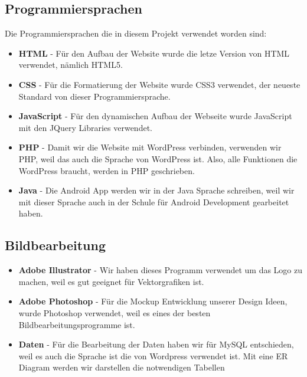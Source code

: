 \subsection{Programmiersprachen}
Die Programmiersprachen die in diesem Projekt verwendet worden sind: 
\begin{itemize}
\item \textbf{HTML} - F\"ur den Aufbau der Website wurde die letze Version von HTML verwendet, n\"amlich HTML5.
\item \textbf{CSS} - F\"ur die Formatierung der Website wurde CSS3 verwendet, der neueste Standard von dieser Programmiersprache.
\item \textbf{JavaScript} - F\"ur den dynamischen Aufbau der Webseite wurde JavaScript mit den JQuery Libraries verwendet.
\item \textbf{PHP} - Damit wir die Website mit WordPress verbinden, verwenden wir PHP, weil das auch die Sprache von WordPress ist. Also, alle Funktionen die WordPress braucht, werden in PHP geschrieben.
\item \textbf{Java} - Die Android App werden wir in der Java Sprache schreiben, weil wir mit dieser Sprache auch in der Schule f\"ur Android Development gearbeitet haben.
\end{itemize}
\subsection{Bildbearbeitung}
\begin{itemize}
\item \textbf{Adobe Illustrator} - Wir haben dieses Programm verwendet um das Logo zu machen, weil es gut geeignet f\"ur Vektorgrafiken ist.
\item \textbf{Adobe Photoshop} - F\"ur die Mockup Entwicklung unserer Design Ideen, wurde Photoshop verwendet, weil es eines der besten Bildbearbeitungsprogramme ist.  
\end{itemize}
\begin{itemize}
\item \textbf{Daten} - F\"ur die Bearbeitung der Daten haben wir f\"ur MySQL entschieden, weil es auch die Sprache ist die von Wordpress verwendet ist. Mit eine ER Diagram werden wir darstellen die notwendigen Tabellen 
\end{itemize}






